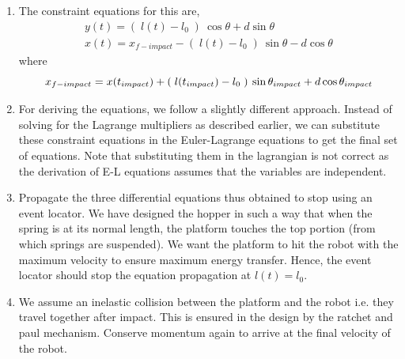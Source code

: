 \begin{enumerate}
  \item
  The constraint equations for this are,
  \begin{eqnarray*}
    y(t) = (\;l(t) - l_0\;)\:\cos \theta + d \sin \theta\\
    x(t) = x_{f-impact} - (\;l(t) - l_0\;)\:\sin \theta - d \cos \theta
  \end{eqnarray*}
  where
  \begin{equation}
  x_{f-impact} =  x(t_{impact}) + (\;l(t_{impact}) - l_0\;)\:\sin \theta_{impact} + d \cos \theta_{impact}\\
  \end{equation}
  \item
  For deriving the equations, we follow a slightly different approach. Instead of solving for the Lagrange multipliers as described earlier, we can substitute these constraint equations in the Euler-Lagrange equations to get the final set of equations. Note that substituting them in the lagrangian is not correct as the derivation of E-L equations assumes that the variables are independent.
  \item
  Propagate the three differential equations thus obtained to stop using an event locator. We have designed the hopper in such a way that when the spring is at its normal length, the platform touches the top portion (from which springs are suspended). We want the platform to hit the robot with the maximum velocity to ensure maximum energy transfer. Hence, the event locator should stop the equation propagation at $l(t) = l_0$.
  \item
  We assume an inelastic collision between the platform and the robot i.e. they travel together after impact. This is ensured in the design by the ratchet and paul mechanism. Conserve momentum again to arrive at the final velocity of the robot.
\end{enumerate}

